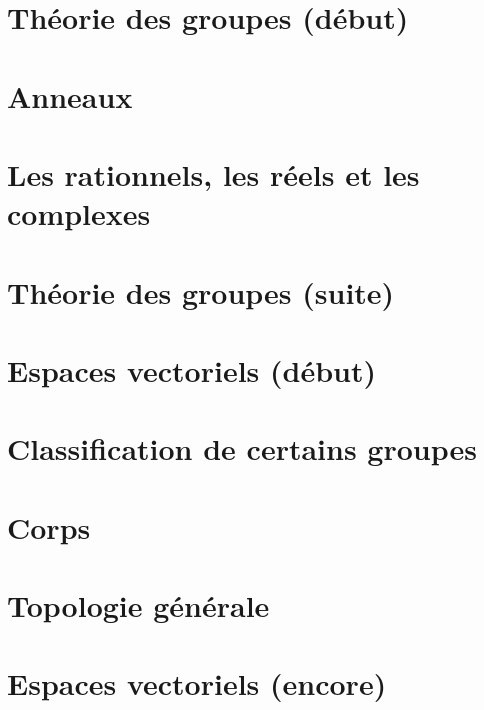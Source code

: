 \documentclass[french,a4paper]{book}
\begin{document}
\chapter{Théorie des groupes (début)}



\chapter{Anneaux}



\chapter{Les rationnels, les réels et les complexes}



\chapter{Théorie des groupes (suite)}


\chapter{Espaces vectoriels (début)}




\chapter{Classification de certains groupes}


\chapter{Corps}




\chapter{Topologie générale}








\chapter{Espaces vectoriels (encore)}








\end{document}
